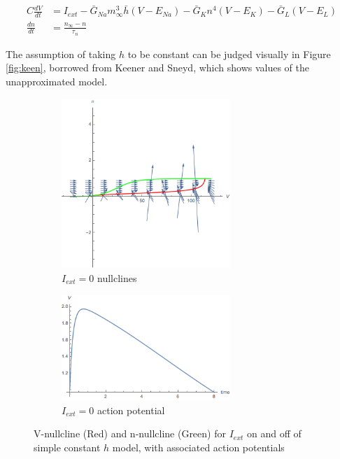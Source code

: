 \documentclass[12]{book}
\newcommand\0{\mathbf{0}}
\newcommand\<{\langle}
\renewcommand\>{\rangle}
\begin{document}
\begin{align*}
        C\frac{dV}{dt} &= I_{ext} -\bar{G}_{Na}m_\infty^3\bar{h}(V-E_{Na}) -\bar{G}_{K}n^4(V-E_{K})  -\bar{G}_{L}(V-E_{L}) \\
    \frac{dn}{dt} &= \frac{n_{\infty}-n}{\tau_n} 
\end{align*}

The assumption of taking $h$ to be constant can be judged visually in Figure \ref{fig:keen}, borrowed from Keener and Sneyd, which shows values of the unapproximated model\cite{keener}.

\begin{figure}[H]
\centering
\begin{subfigure}{0.7\textwidth}
	\centering
	\includegraphics[width=0.7\textwidth]{fastFast_nullc.png}
	\caption{$I_{ext}=0$ nullclines}
\end{subfigure}
\begin{subfigure}{0.7\textwidth}
	\centering
	\includegraphics[width=0.7\textwidth]{fastFast.png}
	\caption{$I_{ext}=0$ action potential}
\end{subfigure}
	\caption{V-nullcline (Red) and n-nullcline (Green) for $I_{ext}$ on and off of simple constant $h$ model, with associated action potentials}
	\label{fig:first}
\end{figure}
\end{document}
